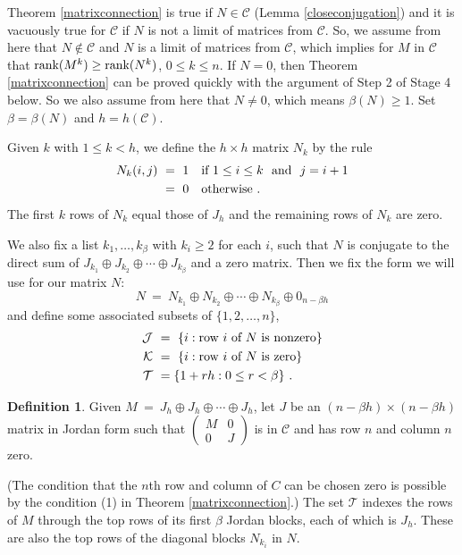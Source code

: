 \documentclass{amsart}
\theoremstyle{definition}
\newtheorem{definition}[theorem]{Definition}
\theoremstyle{remark}
\numberwithin{equation}{section}
\begin{document}
{{Theorem \ref{matrixconnection} is true if $N\in \mathcal C$ 
(Lemma \ref{closeconjugation}) and it is vacuously true 
for $\mathcal C$  if $N$ is not 
a limit of matrices from $\mathcal C$. So, we assume from here 
 that $N\notin \mathcal C$ and 
$N$ is a limit of matrices from $\mathcal C$, which implies 
for $M$ in $\mathcal C$ that 
$\textnormal{rank}(M^k)\geq \textnormal{rank}(N^k)$, $0\leq k\leq n$. 
If $N=0$, then Theorem \ref{matrixconnection} can be proved 
quickly with the argument of Step 2 of Stage 4 below. So 
we also assume from here that $N\neq 0$, which means $\beta (N)\geq 1$. 
Set $\beta =\beta (N)$ and $h=   h(\mathcal C) $. 



Given $k$ with $1\leq k <h$, we define 
the $h\times h$ matrix $N_k$ by the rule 
\begin{align*} 
N_k(i,j) \ &= \ 1 \quad \textnormal{if } 1\leq i \leq k \ \textnormal{ and } \ j=i+1 \\ 
&= \ 0 \quad \textnormal{otherwise } . 
\end{align*} 
The first $k$ rows of $N_k$ equal those of $J_h$ and the remaining rows 
of $N_k$ are zero. 

We also fix a list 
$k_1, \dots , k_{\beta}$ with $k_i\geq 2$ for each $i$, such that 
$N$ is conjugate to the direct sum of 
$J_{k_1} \oplus J_{k_2} \oplus \cdots \oplus J_{k_{\beta}}$ and a 
zero matrix. Then we fix the form we will use for our matrix $N$:  
\[
N \ = \ N_{k_1} \oplus N_{k_2} \oplus \cdots \oplus N_{k_{\beta}} \oplus 0_{n-\beta h}  
\]
and define some associated subsets of $\{1,2, \dots , n\}$,  
\begin{align*} 
\mathcal J \ &=\ \{i: \textnormal{row } i \textnormal{ of } N  \textnormal{ is nonzero} \}\\  
\mathcal K \ &=\ \{i: \textnormal{row } i \textnormal{ of } N  \textnormal{ is zero}\} \\ 
\mathcal T\ &=\{1+rh: 0\leq r < \beta\} \ . 
\end{align*} 

\begin{definition}\label{Jdefinition} Given 
$M \ = \ J_h \oplus J_h \oplus \cdots \oplus J_h$,  
let $J$ be an $(n-\beta h) \times (n-\beta h )$ matrix in Jordan form 
such that 
$
\left(
\begin{smallmatrix} M & 0 \\ 0 & J 
\end{smallmatrix}
\right)
$
is in $\mathcal C$ and has row $n$ and 
column $n$ zero. 
\end{definition} 
(The condition that the $n$th row and column of $C$ can 
be chosen zero is possible by the condition 
  (1) in Theorem \ref{matrixconnection}.) 
The set $\mathcal T$ indexes the rows of $M$ 
 through the 
top rows of its first $\beta $ Jordan blocks, each of which 
is  $J_h$. These are also 
the top rows of the diagonal blocks $N_{k_i}$ in $N$. 

}}
\end{document}
